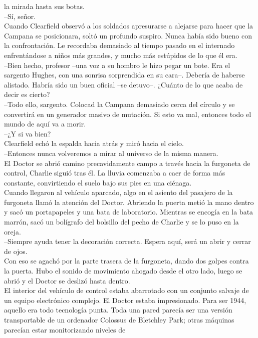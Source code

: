 la mirada hasta sus botas.\\
--Sí, señor.\\
Cuando Clearfield observó a los soldados apresurarse a alejarse para
hacer que la Campana se posicionara, soltó un profundo suspiro. Nunca
había sido bueno con la confrontación. Le recordaba demasiado al tiempo
pasado en el internado enfrentándose a niños más grandes, y mucho más
estúpidos de lo que él era.\\
--Bien hecho, profesor --una voz a su hombro le hizo pegar un bote. Era
el sargento Hughes, con una sonrisa sorprendida en su cara--. Debería de
haberse alistado. Habría sido un buen oficial --se detuvo--. ¿Cuánto de
lo que acaba de decir es cierto?\\
--Todo ello, sargento. Colocad la Campana demasiado cerca del círculo y
se convertirá en un generador masivo de mutación. Si esto va mal,
entonces todo el mundo de aquí va a morir.\\
--¿Y si va bien?\\
Clearfield echó la espalda hacia atrás y miró hacia el cielo.\\
--Entonces nunca volveremos a mirar al universo de la misma
manera.\\[2\baselineskip]El Doctor se abrió camino precavidamente campo
a través hacia la furgoneta de control, Charlie siguió tras él. La
lluvia comenzaba a caer de forma más constante, convirtiendo el suelo
bajo sus pies en una ciénaga.\\
Cuando llegaron al vehículo aparcado, algo en el asiento del pasajero de
la furgoneta llamó la atención del Doctor. Abriendo la puerta metió la
mano dentro y sacó un portapapeles y una bata de laboratorio. Mientras
se encogía en la bata marrón, sacó un bolígrafo del bolsillo del pecho
de Charlie y se lo puso en la oreja.\\
--Siempre ayuda tener la decoración correcta. Espera aquí, será un abrir
y cerrar de ojos.\\
Con eso se agachó por la parte trasera de la furgoneta, dando dos golpes
contra la puerta. Hubo el sonido de movimiento ahogado desde el otro
lado, luego se abrió y el Doctor se deslizó hasta dentro.\\
El interior del vehículo de control estaba abarrotado con un conjunto
salvaje de un equipo electrónico complejo. El Doctor estaba
impresionado. Para ser 1944, aquello era todo tecnología punta. Toda una
pared parecía ser una versión transportable de un ordenador Colossus de
Bletchley Park; otras máquinas parecían estar monitorizando niveles de
